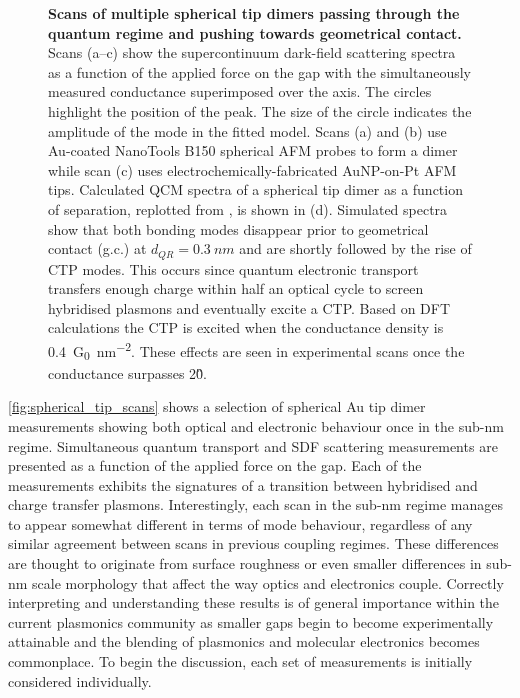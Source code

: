 \documentclass[a4paper, 11pt]{article}
\begin{document}
\begin{figure}[p]
\caption[Scans of multiple spherical tip dimers passing through the quantum regime and pushing towards geometrical contact]{\textbf{Scans of multiple spherical tip dimers passing through the quantum regime and pushing towards geometrical contact.} Scans (a--c) show the supercontinuum dark-field scattering spectra as a function of the applied force on the gap with the simultaneously measured conductance superimposed over the axis. The circles highlight the position of the peak. The size of the circle indicates the amplitude of the mode in the fitted model. Scans (a) and (b) use Au-coated NanoTools B150 spherical AFM probes to form a dimer while scan (c) uses electrochemically-fabricated AuNP-on-Pt AFM tips. Calculated QCM spectra of a spherical tip dimer as a function of separation, replotted from \cite{savage2012}, is shown in (d). Simulated spectra show that both bonding modes disappear prior to geometrical contact (g.c.) at $d_{QR}=\SI{0.3}{nm}$ and are shortly followed by the rise of CTP modes. This occurs since quantum electronic transport transfers enough charge within half an optical cycle to screen hybridised plasmons and eventually excite a CTP. Based on DFT calculations the CTP is excited when the conductance density is \SI{0.4}{G_0.nm^{-2}}. These effects are seen in experimental scans once the conductance surpasses 2\G0.
}
\label{fig:spherical_tip_scans}
\end{figure}

\autoref{fig:spherical_tip_scans} shows a selection of spherical Au tip dimer measurements showing both optical and electronic behaviour once in the sub-nm regime. Simultaneous quantum transport and SDF scattering measurements are presented as a function of the applied force on the gap. Each of the measurements exhibits the signatures of a transition between hybridised and charge transfer plasmons. Interestingly, each scan in the sub-nm regime manages to appear somewhat different in terms of mode behaviour, regardless of any similar agreement between scans in previous coupling regimes. These differences are thought to originate from surface roughness or even smaller differences in sub-nm scale morphology that affect the way optics and electronics couple. Correctly interpreting and understanding these results is of general importance within the current plasmonics community as smaller gaps begin to become experimentally attainable and the blending of plasmonics and molecular electronics becomes commonplace. To begin the discussion, each set of measurements is initially considered individually.
\end{document}

